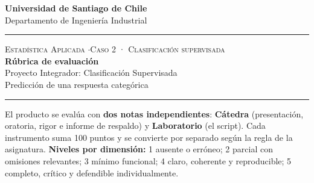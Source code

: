 \documentclass[11pt,letterpaper]{article}
\newcommand{\hrulethin}{\noindent\rule{\textwidth}{0.6pt}}
\begin{document}
\pagestyle{plain}
\begin{center}
    \textbf{\large Universidad de Santiago de Chile}\\[0.1cm]
    Departamento de Ingeniería Industrial
\end{center}
\vspace{0.15cm}\hrulethin\vspace{0.35cm}
\begin{center}
    {\scshape Estadística Aplicada \quad$\cdot$\quad Caso 2 · Clasificación supervisada}\\[0.35cm]
    {\LARGE \textbf{Rúbrica de evaluación}}\\[0.15cm]
    {\large Proyecto Integrador: Clasificación Supervisada}\\[0.2cm]
    Predicción de una respuesta categórica
\end{center}
\vspace{0.2cm}\hrulethin\vspace{0.4cm}
El producto se evalúa con \textbf{dos notas independientes}: \textbf{Cátedra} (presentación, oratoria, rigor e informe de respaldo) y \textbf{Laboratorio} (el script). Cada instrumento suma 100 puntos y se convierte por separado según la regla de la asignatura. \textbf{Niveles por dimensión:} 1 ausente o erróneo; 2 parcial con omisiones relevantes; 3 mínimo funcional;
4 claro, coherente y reproducible; 5 completo, crítico y defendible individualmente.
\end{document}
